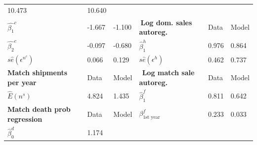 \documentclass[12pt,titlepage]{article}
\begin{document}
\begin{table}
{\begin{tabular}{llllll}
{        10.473}                                                                        & {10.640} \\ \cline{1-3}
        $\widehat{\beta _{1}}^{c}$                                                     & {-1.667}                                       & {
        -1.100}                                                                        & $\ $\textbf{Log dom. sales autoreg.}           & {Data}        &
        {Model} \\ \cline{4-6}
        $\widehat{\beta _{2}}^{c}$                                                     & {-0.097}                                       & {
        -0.680}                                                                        & $\widehat{\beta }_{1}^{h}$                     & {0.976}       &
        {0.864} \\
        $s\widehat{e}(\epsilon ^{n^{c}})$                                              & {0.066}                                        &
        {0.129}                                                                        & $s\widehat{e}(\epsilon ^{h})$                  &
        {0.462}                                                                        & {0.737} \\
        \textbf{Match shipments per year}                                              & {Data}                                         &
        {Model}                                                                        & $\ \ $\textbf{Log match sale autoreg.}         &
        {Data}                                                                         & {Model} \\ \hline
        $\widehat{E}\left( n^{s}\right) $                                              & {4.824}                                        &
        {1.435}                                                                        & $\widehat{\beta }_{1}^{f}$                     & {
        0.811}                                                                         & {0.642} \\
        \textbf{Match death prob regression}                                           & {Data}                                         &
        {Model}                                                                        & $\beta _{\mbox{1st
        year}}^{f}$                                                                    & {0.233}                                        & {0.033} \\
        \cline{1-3}
        $\widehat{\beta }_{0}^{d}$                                                     & {1.174}                                        & {
}
\end{tabular}}
\end{table}
\end{document}
